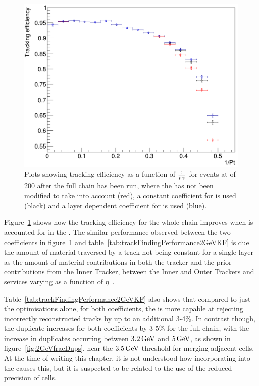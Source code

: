 \begin{figure}[tbp]
\centering
\includegraphics[width=\textwidth]{figs/tk-upgrade/results-lowPtTracking/kfTrackingEffVsInvPtFlatGeometry_5000.pdf}
\caption{Plots showing tracking efficiency as a function of $\frac{1}{p_{\mathrm{T}}}$ for \ttbar events at \PU of 200 after the full chain has been run, where the \KF has not been modified to take \MS into account (red), a constant coefficient for \MS is used (black) and a layer dependent coefficient for \MS is used (blue).
}
\label{fig:2GeVTiltEff}	
\end{figure}

Figure~\ref{fig:2GeVTiltEff} shows how the tracking efficiency for the whole chain improves when \MS is accounted for in the \KF.
The similar performance observed between the two coefficients in figure~\ref{fig:2GeVTiltEff} and table~\ref{tab:trackFindingPerformance2GeVKF} is due the amount of material traversed by a track not being constant for a single layer as the amount of material contributions in both the tracker and the prior contributions from the Inner Tracker, between the Inner and Outer Trackers and services varying as a function of $\eta$~\cite{P2TrackerTDR}.

Table~\ref{tab:trackFindingPerformance2GeVKF} also shows that compared to just the \HT optimisations alone, for both \MS  coefficients, the \KF is more capable at rejecting incorrectly reconstructed tracks by up to an additional 3-4\%.
In contrast though, the duplicate increases for both coefficients by 3-5\% for the full chain, with the increase in duplicates occurring between $3.2\,\text{Ge\hspace{-.08em}V}$ and $5\,\text{Ge\hspace{-.08em}V}$, as shown in figure~\ref{fig:2GeVfracDups}, near the $3.5\,\text{Ge\hspace{-.08em}V}$ threshold for merging adjacent \HT cells.
At the time of writing this chapter, it is not understood how incorporating \MS into the \KF causes this, but it is suspected to be related to the use of the reduced precision of \HT cells.

